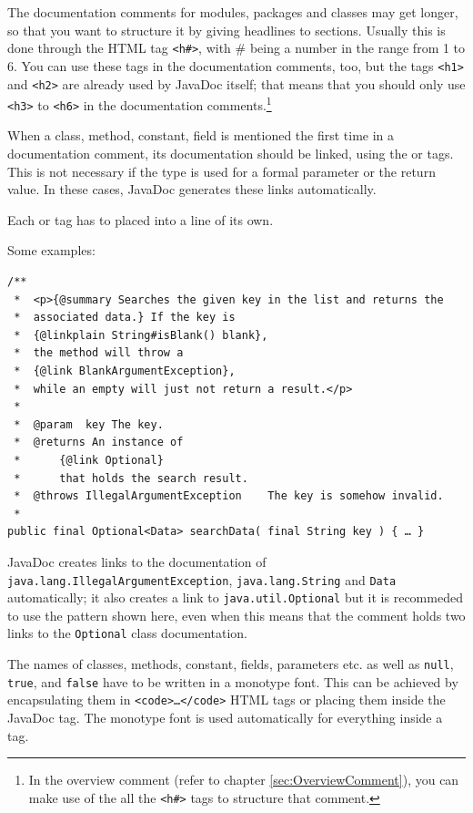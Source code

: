 \documentclass[11pt,a4paper, titlepage, parskip=half, headsepline, footsepline, cleardoublepage=current, headheight=1cm]{scrbook}
\begin{document}
The documentation comments for modules, packages and classes may get longer, so that you want to structure it by giving headlines to sections. Usually this is done through the HTML tag \lstinline|<h#>|, with \# being a number in the range from 1 to 6. You can use these tags in the documentation comments, too, but the tags \lstinline|<h1>| and \lstinline|<h2>| are already used by JavaDoc itself; that means that you should only use \lstinline|<h3>| to \lstinline|<h6>| in the documentation comments.\footnote{In the overview comment (refer to chapter \ref{sec:OverviewComment}), you can make use of the all the \lstinline|<h#>| tags to structure that comment.}

When a class, method, constant, field is mentioned the first time in a documentation comment, its documentation should be linked, using the  or  tags. This is not necessary if the type is used for a formal parameter or the return value. In these cases, JavaDoc generates these links automatically.

Each  or  tag has to placed into a line of its own.

Some examples:
\begin{lstlisting}
/**
 *  <p>{@summary Searches the given key in the list and returns the
 *  associated data.} If the key is
 *  {@linkplain String#isBlank() blank},
 *  the method will throw a
 *  {@link BlankArgumentException},
 *  while an empty will just not return a result.</p>
 *
 *  @param  key The key.
 *  @returns An instance of
 *      {@link Optional}
 *      that holds the search result.
 *  @throws IllegalArgumentException    The key is somehow invalid.
 *
public final Optional<Data> searchData( final String key ) { … }
\end{lstlisting}

JavaDoc creates links to the documentation of \lstinline|java.lang.IllegalArgumentException|, \lstinline|java.lang.String| and \lstinline|Data| automatically; it also creates a link to \lstinline|java.util.Optional| but it is recommeded to use the pattern shown here, even when this means that the comment holds two links to the \lstinline|Optional| class documentation.

The names of classes, methods, constant, fields, parameters etc. as well as \lstinline|null|, \lstinline|true|, and \lstinline|false| have to be written in a monotype font. This can be achieved by encapsulating them in \lstinline|<code>…</code>| HTML tags or placing them inside the JavaDoc  tag. The monotype font is used automatically for everything inside a  tag.
\end{document}
